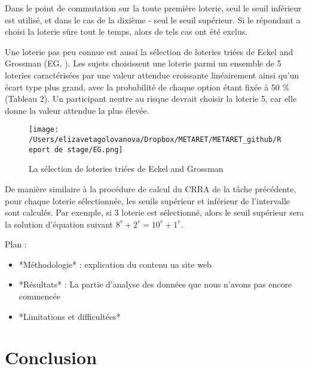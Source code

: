 \documentclass[12pt]{article}
\begin{document}
Dans le point de commutation sur la toute première loterie, seul le
seuil inférieur est utilisé, et dans le cas de la dixième - seul le
seuil supérieur. Si le répondant a choisi la loterie sûre tout le temps,
alors de tels cas ont été exclus.

Une loterie pas peu connue est aussi la sélection de loteries triées de
Eckel and Grossman (EG, \citet{Eckel2002}). Les sujets choisissent une
loterie parmi un ensemble de 5 loteries caractérisées par une valeur
attendue croissante linéairement ainsi qu'un écart type plus grand, avec
la probabilité de chaque option étant fixée à 50 \% (Tableau 2). Un
participant neutre au risque devrait choisir la loterie 5, car elle
donne la valeur attendue la plus élevée.

\begin{figure}
\centering
\texttt{[image: /Users/elizavetagolovanova/Dropbox/METARET/METARET\_github/Report de stage/EG.png]}
\caption{La sélection de loteries triées de Eckel and Grossman}
\end{figure}

De manière similaire à la procédure de calcul du CRRA de la tâche
précédente, pour chaque loterie sélectionnée, les seuils supérieur et
inférieur de l'intervalle sont calculés. Par exemple, si 3 loterie est
sélectionné, alors le seuil supérieur sera la solution d'équation
suivant \(8^r + 2^r = 10^r + 1^r\).

Plan :

\begin{itemize}


\item *Méthodologie* : explication du contenu ua site web


\item *Résultats* : La partie d'analyse des données que nous n'avons pas encore commencée

\item *Limitations et difficultées*

\end{itemize}

\section{Conclusion}
\label{sec:fifth}



\end{document}
